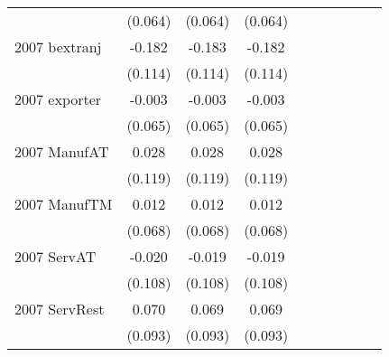 \begin{table}[htbp]
\begin{tabular}{l*{9}{c}}
                    &     (0.064)   &     (0.064)   &     (0.064)   &               &               &               &               &               &               \\
2007 bextranj       &      -0.182   &      -0.183   &      -0.182   &               &               &               &               &               &               \\
                    &     (0.114)   &     (0.114)   &     (0.114)   &               &               &               &               &               &               \\
2007 exporter       &      -0.003   &      -0.003   &      -0.003   &               &               &               &               &               &               \\
                    &     (0.065)   &     (0.065)   &     (0.065)   &               &               &               &               &               &               \\
2007 ManufAT        &       0.028   &       0.028   &       0.028   &               &               &               &               &               &               \\
                    &     (0.119)   &     (0.119)   &     (0.119)   &               &               &               &               &               &               \\
2007 ManufTM        &       0.012   &       0.012   &       0.012   &               &               &               &               &               &               \\
                    &     (0.068)   &     (0.068)   &     (0.068)   &               &               &               &               &               &               \\
2007 ServAT         &      -0.020   &      -0.019   &      -0.019   &               &               &               &               &               &               \\
                    &     (0.108)   &     (0.108)   &     (0.108)   &               &               &               &               &               &               \\
2007 ServRest       &       0.070   &       0.069   &       0.069   &               &               &               &               &               &               \\
                    &     (0.093)   &     (0.093)   &     (0.093)   &               &               &               &               &               &               \\

\end{tabular}
\end{table}
